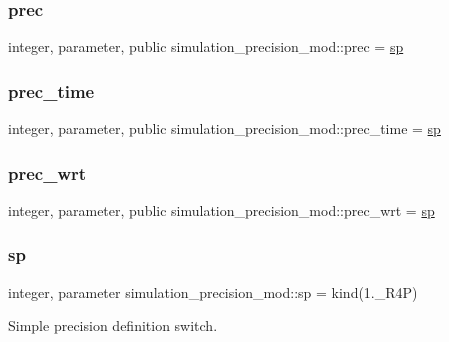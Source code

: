 \subsubsection{\texorpdfstring{prec}{prec}}
{\footnotesize\ttfamily integer, parameter, public simulation\+\_\+precision\+\_\+mod\+::prec = \hyperlink{namespacesimulation__precision__mod_a15b1ab993f9b11430e9d9d3dc6c77614}{sp}}

\mbox{\label{namespacesimulation__precision__mod_a3833ad1bc52c3738ac861591b7492737}} 
\subsubsection{\texorpdfstring{prec\+\_\+time}{prec\_time}}
{\footnotesize\ttfamily integer, parameter, public simulation\+\_\+precision\+\_\+mod\+::prec\+\_\+time = \hyperlink{namespacesimulation__precision__mod_a15b1ab993f9b11430e9d9d3dc6c77614}{sp}}

\mbox{\label{namespacesimulation__precision__mod_ad515822198607dfee68a6ed8b246c7da}} 
\subsubsection{\texorpdfstring{prec\+\_\+wrt}{prec\_wrt}}
{\footnotesize\ttfamily integer, parameter, public simulation\+\_\+precision\+\_\+mod\+::prec\+\_\+wrt = \hyperlink{namespacesimulation__precision__mod_a15b1ab993f9b11430e9d9d3dc6c77614}{sp}}

\mbox{\label{namespacesimulation__precision__mod_a15b1ab993f9b11430e9d9d3dc6c77614}} 
\subsubsection{\texorpdfstring{sp}{sp}}
{\footnotesize\ttfamily integer, parameter simulation\+\_\+precision\+\_\+mod\+::sp = kind(1.\+\_\+\+R4P)\hspace{0.3cm}{\ttfamily [private]}}



Simple precision definition switch. 

